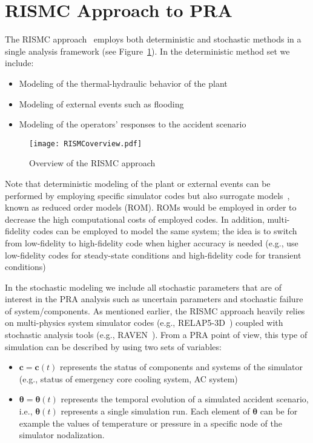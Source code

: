 \section{RISMC Approach to PRA}
\label{sec:rismc}

The RISMC approach~\cite{RISMC} employs both deterministic and stochastic methods 
in a single analysis framework (see Figure~\ref{fig:RISMCoverview}). In the deterministic method 
set we include:
\begin{itemize}
  \item Modeling of the thermal-hydraulic behavior of the plant~\cite{BWR_SBO_Mandelli,BWRanalysis}
  \item Modeling of external events such as flooding~\cite{mandelliPSA2015}
  \item Modeling of the operators’ responses to the accident scenario~\cite{HRA_BoringReport2014}
\end{itemize}

\begin{figure}
    \centering
    \centerline{\texttt{[image: RISMCoverview.pdf]}}
    \caption{Overview of the RISMC approach}
    \label{fig:RISMCoverview}
\end{figure}

Note that deterministic modeling of the plant or external events can be performed by employing specific 
simulator codes but also surrogate models~\cite{ROM}, known as reduced order models (ROM). ROMs would 
be employed 
in order to decrease the high computational costs of employed codes. In addition, multi-fidelity codes 
can be employed to model the same system; the idea is to switch from low-fidelity to high-fidelity code 
when higher accuracy is needed (e.g., use low-fidelity codes for steady-state conditions and high-fidelity 
code for transient conditions)

In the stochastic modeling we include all stochastic parameters that are of interest in the PRA analysis 
such as uncertain parameters and stochastic failure of system/components.
As mentioned earlier, the RISMC approach heavily relies on multi-physics system simulator codes 
(e.g., RELAP5-3D~\cite{relap5}) coupled with stochastic analysis tools (e.g., RAVEN~\cite{raven}).  
From a PRA point of view, this type of simulation can be described by using two sets of variables:
\begin{itemize}
  \item $\boldsymbol c = \boldsymbol c(t)$ represents the status of components and systems of the simulator 
        (e.g., status of emergency core cooling system, AC system)
  \item $\boldsymbol \theta = \boldsymbol \theta (t)$ represents the temporal evolution of a simulated 
        accident scenario, i.e., $\boldsymbol \theta (t)$ represents a single simulation run. 
        Each element of $\boldsymbol \theta$ can be for example the values of temperature or pressure in 
        a specific node of the simulator nodalization.
\end{itemize}

